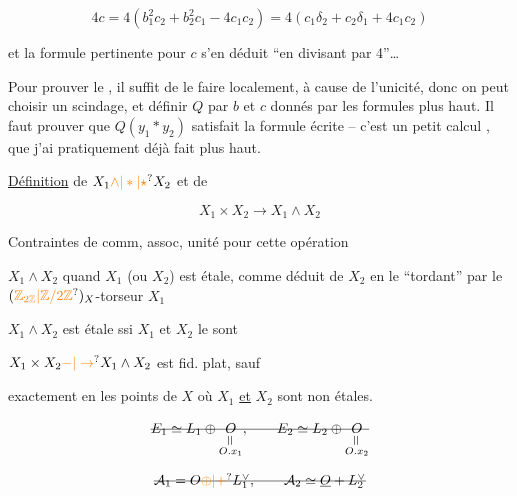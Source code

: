 \[ 4c=4\left(b_1^2c_2+b_2^2c_1-4c_1c_2\right)=4(c_1\delta_2+c_2\delta_1+4c_1c_2) \]


et la formule pertinente pour $c$ s'en déduit ``en divisant par 4''\ldots

Pour prouver le , il suffit de le faire localement, à cause de l'unicité, donc on peut choisir un scindage, et définir $Q$  par $b$ et $c$ donnés par les formules plus haut. Il faut prouver que $Q(y_1*y_2)$ satisfait la formule écrite -- c'est un petit calcul , que j'ai pratiquement déjà fait plus haut.

\uline{Définition} de $X_1\unsure{\wedge|*|\star}X_2$ et de

\[ X_1\times X_2\longrightarrow X_1\wedge X_2 \]

Contraintes de comm, assoc, unité pour cette opération

$X_1\wedge X_2$ quand $X_1$ (ou $X_2$) est étale, comme déduit de $X_2$ en le ``tordant'' par le $(\unsure{\mathbb{Z}_{2\mathbb Z}|\mathbb Z/2\mathbb Z})_X$-torseur $X_1$

$X_1\wedge X_2$ est étale ssi $X_1$ et $X_2$ le sont

$X_1\times X_2\unsure{-|\to}X_1\wedge X_2$ est fid. plat, sauf


exactement en les points de $X$   \unsure{)|\,}  où $X_1$ \uline{et} $X_2$ sont non étales.


\[ \deleted{E_1\simeq L_1\oplus\underset{\substack{\rotatebox{90}{$=$}\\O.x_1}}{O},\qquad E_2\simeq L_2\oplus\underset{\substack{\rotatebox{90}{$=$}\\O.x_2}}{O}} \]


\[ \deleted{\mathcal{A}_1=O\unsure{\oplus|+}L_1^\vee,\qquad\mathcal{A}_2\simeq\underline O+L_2^\vee} \]



